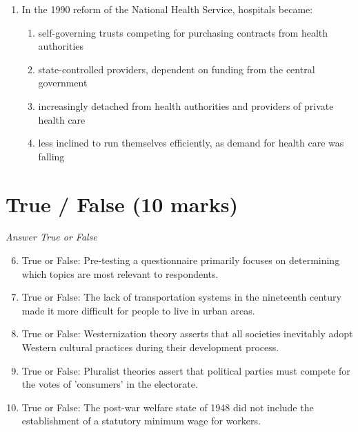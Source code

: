 \documentclass[12pt]{article}
\begin{document}
\begin{enumerate}[label=\arabic*.]
\begin{enumerate}[label=(\alph*)]
    \item effervescent ceremonies that create a feeling of belonging
    \item images of gods or totems that are widely recognized
    \item shared ideas and moral values, often symbolized by an object or figurehead
    \item ideological tools used to obscure class divisions
\end{enumerate}
\item In the 1990 reform of the National Health Service, hospitals became:
\begin{enumerate}[label=(\alph*)]
    \item self-governing trusts competing for purchasing contracts from health authorities
    \item state-controlled providers, dependent on funding from the central government
    \item increasingly detached from health authorities and providers of private health care
    \item less inclined to run themselves efficiently, as demand for health care was falling
\end{enumerate}
\end{enumerate}

\section*{True / False (10 marks)}
\textit{Answer True or False}
\begin{enumerate}[label=\arabic*.]
\setcounter{enumi}{5}
\item True or False: Pre-testing a questionnaire primarily focuses on determining which topics are most relevant to respondents.
\item True or False: The lack of transportation systems in the nineteenth century made it more difficult for people to live in urban areas.
\item True or False: Westernization theory asserts that all societies inevitably adopt Western cultural practices during their development process.
\item True or False: Pluralist theories assert that political parties must compete for the votes of 'consumers' in the electorate.
\item True or False: The post-war welfare state of 1948 did not include the establishment of a statutory minimum wage for workers.
\end{enumerate}
\end{document}
